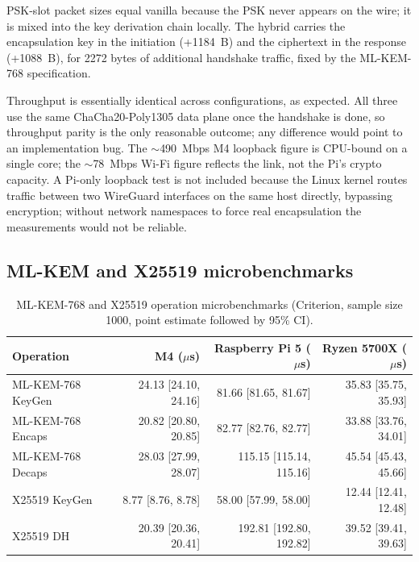 \documentclass[11pt,a4paper]{article}
\begin{document}
PSK-slot packet sizes equal vanilla because the PSK never appears on the wire; it is mixed into the key derivation chain locally. The hybrid carries the encapsulation key in the initiation (+1184~B) and the ciphertext in the response (+1088~B), for 2272 bytes of additional handshake traffic, fixed by the ML-KEM-768 specification.

Throughput is essentially identical across configurations, as expected. All three use the same ChaCha20-Poly1305 data plane once the handshake is done, so throughput parity is the only reasonable outcome; any difference would point to an implementation bug. The $\sim$490~Mbps M4 loopback figure is CPU-bound on a single core; the $\sim$78~Mbps Wi-Fi figure reflects the link, not the Pi's crypto capacity. A Pi-only loopback test is not included because the Linux kernel routes traffic between two WireGuard interfaces on the same host directly, bypassing encryption; without network namespaces to force real encapsulation the measurements would not be reliable.

\subsection{ML-KEM and X25519 microbenchmarks}

\begin{table}[H]
\centering
\caption{ML-KEM-768 and X25519 operation microbenchmarks (Criterion, sample size 1000, point estimate followed by 95\% CI).}
\label{tab:mlkem_benchmarks}
\small
\setlength{\tabcolsep}{4pt}
\begin{tabular}{@{}lrrr@{}}
\toprule
\textbf{Operation} & \textbf{M4 ($\mu$s)} & \textbf{Raspberry Pi 5 ($\mu$s)} & \textbf{Ryzen 5700X ($\mu$s)} \\
\midrule
ML-KEM-768 KeyGen & 24.13 [24.10, 24.16] & 81.66 [81.65, 81.67]    & 35.83 [35.75, 35.93]    \\
ML-KEM-768 Encaps & 20.82 [20.80, 20.85] & 82.77 [82.76, 82.77]    & 33.88 [33.76, 34.01]    \\
ML-KEM-768 Decaps & 28.03 [27.99, 28.07] & 115.15 [115.14, 115.16] & 45.54 [45.43, 45.66]    \\
\midrule
X25519 KeyGen     & 8.77 [8.76, 8.78]    & 58.00 [57.99, 58.00]    & 12.44 [12.41, 12.48]    \\
X25519 DH         & 20.39 [20.36, 20.41] & 192.81 [192.80, 192.82] & 39.52 [39.41, 39.63]    \\
\bottomrule
\end{tabular}
\end{table}
\end{document}
